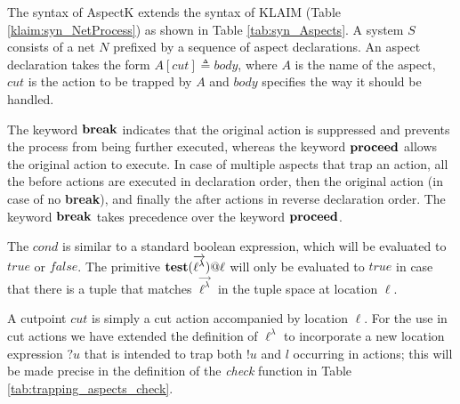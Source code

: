 \documentclass[a4paper]{llncs}
\makeatletter
\newcommand{\In}[2]{{\bf in}({#1})@{\it #2}}
\newcommand{\Test}[2]{{\bf test}({#1})@{\it #2}}
\newcommand{\Lnt}{\ell^\lambda}
\newcommand{\Lc}{\ell}
\newcommand{\Lbt}{\ell^\lambda}
\newcommand{\Lb}{\ell}
\newcommand{\veck}[1]{\overrightarrow{#1}}
\makeatother
\begin{document}
The syntax of AspectK extends the syntax of KLAIM (Table \ref{klaim:syn_NetProcess})
as shown in Table
\ref{tab:syn_Aspects}.
A system $S$ consists of a net $N$ prefixed by a sequence of 
aspect declarations.
An aspect declaration takes the form $A[cut] \triangleq body$, where
$A$ is the name of the aspect,
$cut$ is the action to be trapped by $A$ and $body$ specifies
the way it should be handled.

The keyword ${\bf break}$ indicates that the original action
 is suppressed and prevents the process from being
further executed, whereas the keyword ${\bf proceed}$ allows 
the original action to execute. %
In case of multiple aspects that trap an action,
all the before actions are executed in declaration order, then
the original action (in case of no {\bf break}), and finally the after
actions in reverse declaration order. The keyword ${\bf break}$
takes precedence over the keyword ${\bf proceed}$.

The $cond$ is similar to a standard boolean expression, which will
be evaluated to $true$ or $false$. 
The primitive $\Test{\veck{\Lbt}}{\Lb}$
will only be evaluated to $true$ in case that there is a tuple that
matches $\veck{\Lbt}$
in the tuple space at location $\Lb$.

A cutpoint $cut$ is simply a cut action accompanied by location $\Lc$.
For the use in cut actions we have extended the definition of $\Lnt$ 
to incorporate a new location expression $?u$ that is intended to trap
both $!u$ and $l$ occurring in actions; this will be made precise in
the definition of the \emph{check} function in Table 
\ref{tab:trapping_aspects_check}.

\begin{comment}
We use the defining occurrence of cut
location variable  $!\beta$ when we want to bind an instance of $!u$
or $l$ and we use $u$ to bind $l$ in a normal action. As an example
the $cut$ of
\begin{displaymath}
A[u_1::\textrm{\In{$u_2,!\beta$}{$u_4$}}]
\end{displaymath}
will bind $u$ to $\beta$ when matching against the normal action
$l_1::\textrm{\In{$l_2,!u$}{$l_4$}}$; and it will bind $l_3$ to
$\beta$ when matching against the normal action
$l_1::\textrm{\In{$l_2,l_3$}{$l_4$}}$. In both cases $l_1$, $l_2$
and $l_4$ are bound to $u_1$, $u_2$ and $u_4$, respectively. %
\end{comment}

\end{document}
